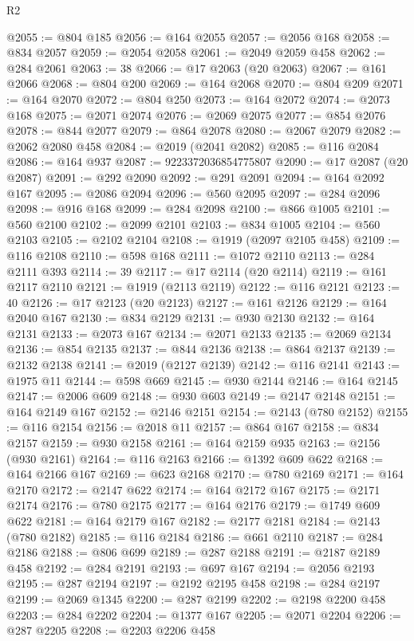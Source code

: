 \begin{lexlean}{R2}
\begin{coremodule}
@2055 := @804 @185
@2056 := @164 @2055
@2057 := @2056 @168
@2058 := @834 @2057
@2059 := @2054 @2058
@2061 := @2049 @2059 @458
@2062 := @284 @2061
@2063 := 38
@2066 := @17 @2063 (@20 @2063)
@2067 := @161 @2066
@2068 := @804 @200
@2069 := @164 @2068
@2070 := @804 @209
@2071 := @164 @2070
@2072 := @804 @250
@2073 := @164 @2072
@2074 := @2073 @168
@2075 := @2071 @2074
@2076 := @2069 @2075
@2077 := @854 @2076
@2078 := @844 @2077
@2079 := @864 @2078
@2080 := @2067 @2079
@2082 := @2062 @2080 @458
@2084 := @2019 (@2041 @2082)
@2085 := @116 @2084
@2086 := @164 @937
@2087 := 9223372036854775807
@2090 := @17 @2087 (@20 @2087)
@2091 := @292 @2090
@2092 := @291 @2091
@2094 := @164 @2092 @167
@2095 := @2086 @2094
@2096 := @560 @2095
@2097 := @284 @2096
@2098 := @916 @168
@2099 := @284 @2098
@2100 := @866 @1005
@2101 := @560 @2100
@2102 := @2099 @2101
@2103 := @834 @1005
@2104 := @560 @2103
@2105 := @2102 @2104
@2108 := @1919 (@2097 @2105 @458)
@2109 := @116 @2108
@2110 := @598 @168
@2111 := @1072 @2110
@2113 := @284 @2111 @393
@2114 := 39
@2117 := @17 @2114 (@20 @2114)
@2119 := @161 @2117 @2110
@2121 := @1919 (@2113 @2119)
@2122 := @116 @2121
@2123 := 40
@2126 := @17 @2123 (@20 @2123)
@2127 := @161 @2126
@2129 := @164 @2040 @167
@2130 := @834 @2129
@2131 := @930 @2130
@2132 := @164 @2131
@2133 := @2073 @167
@2134 := @2071 @2133
@2135 := @2069 @2134
@2136 := @854 @2135
@2137 := @844 @2136
@2138 := @864 @2137
@2139 := @2132 @2138
@2141 := @2019 (@2127 @2139)
@2142 := @116 @2141
@2143 := @1975 @11
@2144 := @598 @669
@2145 := @930 @2144
@2146 := @164 @2145
@2147 := @2006 @609
@2148 := @930 @603
@2149 := @2147 @2148
@2151 := @164 @2149 @167
@2152 := @2146 @2151
@2154 := @2143 (@780 @2152)
@2155 := @116 @2154
@2156 := @2018 @11
@2157 := @864 @167
@2158 := @834 @2157
@2159 := @930 @2158
@2161 := @164 @2159 @935
@2163 := @2156 (@930 @2161)
@2164 := @116 @2163
@2166 := @1392 @609 @622
@2168 := @164 @2166 @167
@2169 := @623 @2168
@2170 := @780 @2169
@2171 := @164 @2170
@2172 := @2147 @622
@2174 := @164 @2172 @167
@2175 := @2171 @2174
@2176 := @780 @2175
@2177 := @164 @2176
@2179 := @1749 @609 @622
@2181 := @164 @2179 @167
@2182 := @2177 @2181
@2184 := @2143 (@780 @2182)
@2185 := @116 @2184
@2186 := @661 @2110
@2187 := @284 @2186
@2188 := @806 @699
@2189 := @287 @2188
@2191 := @2187 @2189 @458
@2192 := @284 @2191
@2193 := @697 @167
@2194 := @2056 @2193
@2195 := @287 @2194
@2197 := @2192 @2195 @458
@2198 := @284 @2197
@2199 := @2069 @1345
@2200 := @287 @2199
@2202 := @2198 @2200 @458
@2203 := @284 @2202
@2204 := @1377 @167
@2205 := @2071 @2204
@2206 := @287 @2205
@2208 := @2203 @2206 @458

\end{coremodule}
\end{lexlean}
